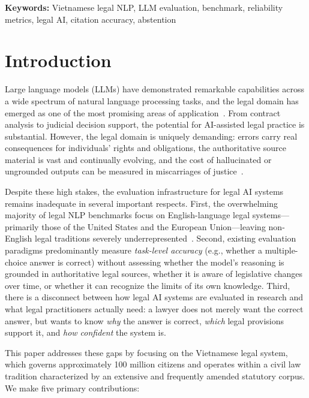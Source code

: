\documentclass[11pt,a4paper]{article}
\begin{document}
\noindent\textbf{Keywords:} Vietnamese legal NLP, LLM evaluation, benchmark, reliability metrics, legal AI, citation accuracy, abstention

\vspace{0.5em}

\section{Introduction}
\label{sec:introduction}

Large language models (LLMs) have demonstrated remarkable capabilities across a wide spectrum of natural language processing tasks, and the legal domain has emerged as one of the most promising areas of application~\citep{cui2023chatlaw,chalkidis2020legal,li2023scalable}.
From contract analysis to judicial decision support, the potential for AI-assisted legal practice is substantial.
However, the legal domain is uniquely demanding: errors carry real consequences for individuals' rights and obligations, the authoritative source material is vast and continually evolving, and the cost of hallucinated or ungrounded outputs can be measured in miscarriages of justice~\citep{dahl2024large,magesh2024hallucinations}.

Despite these high stakes, the evaluation infrastructure for legal AI systems remains inadequate in several important respects.
First, the overwhelming majority of legal NLP benchmarks focus on English-language legal systems---primarily those of the United States and the European Union---leaving non-English legal traditions severely underrepresented~\citep{guha2023legalbench,huang2023law}.
Second, existing evaluation paradigms predominantly measure \emph{task-level accuracy} (e.g., whether a multiple-choice answer is correct) without assessing whether the model's reasoning is grounded in authoritative legal sources, whether it is aware of legislative changes over time, or whether it can recognize the limits of its own knowledge.
Third, there is a disconnect between how legal AI systems are evaluated in research and what legal practitioners actually need: a lawyer does not merely want the correct answer, but wants to know \emph{why} the answer is correct, \emph{which} legal provisions support it, and \emph{how confident} the system is.

This paper addresses these gaps by focusing on the Vietnamese legal system, which governs approximately 100 million citizens and operates within a civil law tradition characterized by an extensive and frequently amended statutory corpus.
We make five primary contributions:
\end{document}
